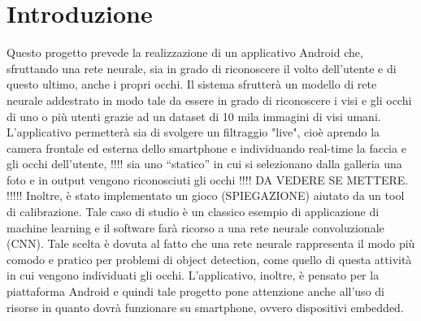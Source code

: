\documentclass[11pt]{article}
\begin{document}
\clearpage
\null
\thispagestyle{empty}
\clearpage

\newpage







\cleardoublepage



\newpage

\tableofcontents


\newpage


\listoffigures



\newpage


\newpage
\fancyfoot[L]{\thepage}
\setcounter{page}{1}
\section{Introduzione}
Questo progetto prevede la realizzazione di un applicativo Android che, sfruttando una rete neurale,
sia in grado di riconoscere il volto dell’utente e di questo ultimo, anche i propri occhi. Il sistema sfrutterà un modello di rete neurale
addestrato in modo tale da essere in grado di riconoscere i visi e gli occhi di uno o più utenti grazie ad un dataset di 10 mila immagini di visi umani.
L’applicativo permetterà sia di svolgere un filtraggio "live", cioè aprendo la camera frontale ed esterna dello smartphone
e individuando real-time la faccia e gli occhi dell’utente, !!!! sia uno “statico” in cui si selezionano dalla galleria
una foto e in output vengono riconosciuti gli occhi !!!! DA VEDERE SE METTERE. !!!!!
\newline
Inoltre, è stato implementato un gioco (SPIEGAZIONE) aiutato da un tool di calibrazione.
\newline \newline
Tale caso di studio è un classico esempio di applicazione di machine learning e il software farà ricorso
a una rete neurale convoluzionale (CNN). Tale scelta è dovuta al fatto che una rete neurale
rappresenta il modo più comodo e pratico per problemi di object detection, come quello di questa
attività in cui vengono individuati gli occhi.
\newline \newline
L’applicativo, inoltre, è pensato per la piattaforma Android e quindi tale progetto pone attenzione
anche all’uso di risorse in quanto dovrà funzionare su smartphone, ovvero dispositivi embedded.

\newpage
\end{document}
